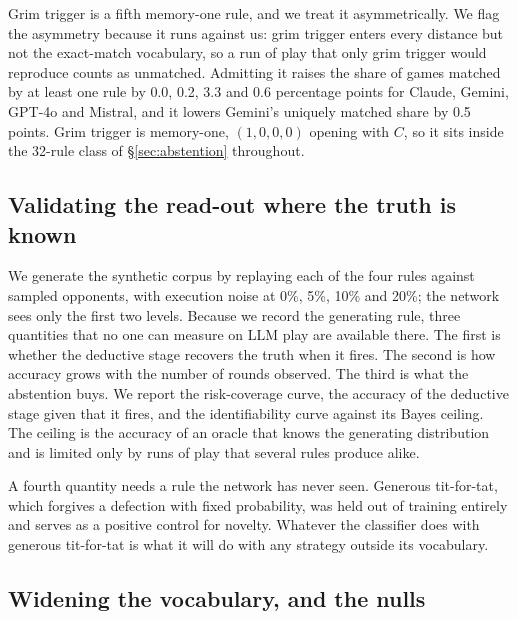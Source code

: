 \documentclass[11pt,a4paper]{article}
\begin{document}
Grim trigger is a fifth memory-one rule, and we treat it asymmetrically. We
flag the asymmetry because it runs against us: grim trigger enters every
distance but not the exact-match vocabulary, so a run of play that only grim
trigger would reproduce counts as unmatched. Admitting it raises the share of
games matched by at least one rule by 0.0, 0.2, 3.3 and 0.6 percentage points
for Claude, Gemini, GPT-4o and Mistral, and it lowers Gemini's uniquely
matched share by 0.5 points. Grim trigger is memory-one, $(1,0,0,0)$ opening
with $C$, so it sits inside the 32-rule class of \S\ref{sec:abstention}
throughout.

\subsection{Validating the read-out where the truth is known}
\label{sec:validation-method}

We generate the synthetic corpus by replaying each of the four rules against
sampled opponents, with execution noise at 0\%, 5\%, 10\% and 20\%; the
network sees only the first two levels. Because we record the generating rule,
three quantities that no one can measure on LLM play are available there. The
first is whether the deductive stage recovers the truth when it fires. The
second is how accuracy grows with the number of rounds observed. The third is
what the abstention buys. We report the risk-coverage curve, the accuracy of
the deductive stage given that it fires, and the identifiability curve against
its Bayes ceiling. The ceiling is the accuracy of an oracle that knows the
generating distribution and is limited only by runs of play that several rules
produce alike.

A fourth quantity needs a rule the network has never seen. Generous
tit-for-tat, which forgives a defection with fixed probability, was held out
of training entirely and serves as a positive control for novelty. Whatever
the classifier does with generous tit-for-tat is what it will do with any
strategy outside its vocabulary.

\subsection{Widening the vocabulary, and the nulls}
\label{sec:widening}
\end{document}
